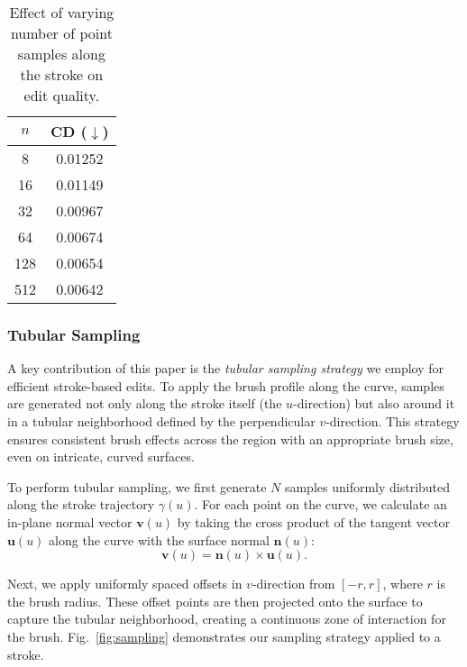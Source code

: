 \begin{table*}[htbp]
  \hfill
  \begin{minipage}{0.14\textwidth}
    \centering
    \setlength{\tabcolsep}{3pt}
    \begin{tabular}{|c|c|}
                \hline
                $n$ & CD ($\downarrow$) \\
                \hline
                8   & 0.01252 \\\hline
                16  & 0.01149 \\\hline
                32  & 0.00967 \\\hline
                64  & 0.00674 \\\hline
                128 & 0.00654 \\\hline
                512 & 0.00642 \\\hline
            \end{tabular}
            \caption{Effect of varying number of point samples along the stroke on edit quality.}
            \label{tab:cd_values}
    \vspace{-1em}
  \end{minipage}
\end{table*}
\subsubsection{Tubular Sampling}

A key contribution of this paper is the \textit{tubular sampling strategy} we employ for efficient stroke-based edits. To apply the brush profile along the curve, samples are generated not only along the stroke itself (the \( u \)-direction) but also around it in a tubular neighborhood defined by the perpendicular \( v \)-direction. This strategy ensures consistent brush effects across the region with an appropriate brush size, even on intricate, curved surfaces.
 
To perform tubular sampling, we first generate \(N \) samples uniformly distributed along the stroke trajectory \( \gamma(u) \). For each point on the curve, we calculate an in-plane normal vector \( \mathbf{v}(u) \) by taking the cross product of the tangent vector \( \mathbf{u}(u) \) along the curve with the surface normal \( \mathbf{n}(u) \):
\begin{equation}
\mathbf{v}(u) = \mathbf{n}(u) \times \mathbf{u}(u).
\end{equation}

Next, we apply uniformly spaced offsets in \( v \)-direction from \([-r, r]\), where \( r \) is the brush radius. These offset points are then projected onto the surface to capture the tubular neighborhood, creating a continuous zone of interaction for the brush. Fig.~\ref{fig:sampling} demonstrates our sampling strategy applied to a stroke.


